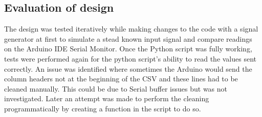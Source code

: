 \subsection{Evaluation of design}
The design was tested iteratively while making changes to the code with a signal generator at first to simulate a stead known input signal and compare readings on the Arduino IDE Serial Monitor. Once the Python script was fully working, tests were performed again for the python script's ability to read the values sent correctly. An issue was identified where sometimes the Arduino would send the column headers not at the beginning of the CSV and these lines had to be cleaned manually. This could be due to Serial buffer issues but was not investigated. Later an attempt was made to perform the cleaning programmatically by creating a function in the script to do so.

